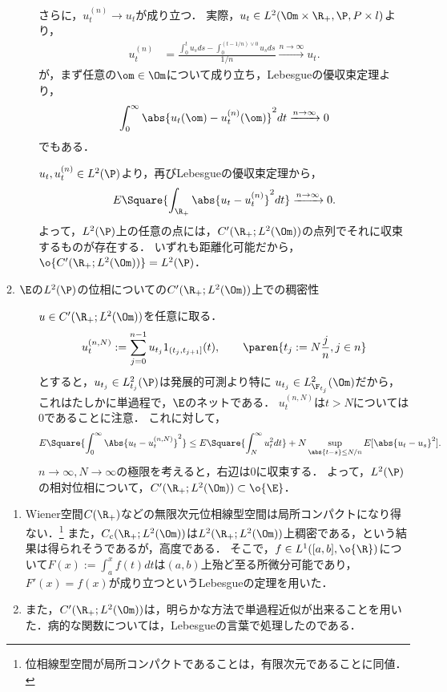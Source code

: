 \documentclass[uplatex,dvipdfmx]{jsreport}
\begin{document}
\begin{Proof}
\begin{description}
        さらに，$u_t^{(n)}\to u_t$が成り立つ．
        実際，$u_t\in L^2(\Om\times\R_+,\P,P\times l)$より，
        \begin{align*}
            u_t^{(n)}&=\frac{\int^t_0u_sds-\int^{(t-1/n)\lor0}_0u_sds}{1/n}\xrightarrow{n\to\infty}u_t.
        \end{align*}
        が，まず任意の$\om\in\Om$について成り立ち，Lebesgueの優収束定理より，
        \[\int^\infty_0\abs{u_t(\om)-u^{(n)}_t(\om)}^2dt\xrightarrow{n\to\infty}0\]
        でもある．
        
        $u_t,u_t^{(n)}\in L^2(\P)$より，再びLebesgueの優収束定理から，
        \[E\Square{\int_{\R_+}\abs{u_t-u_t^{(n)}}^2dt}\xrightarrow{n\to\infty}0.\]
        よって，$L^2(\P)$上の任意の点には，$C'(\R_+;L^2(\Om))$の点列でそれに収束するものが存在する．
        いずれも距離化可能だから，$\o{C'(\R_+;L^2(\Om))}=L^2(\P)$．
        \item[2. $\E$の$L^2(\P)$の位相についての$ C'(\R_+;L^2(\Om))$上での稠密性]
        $u\in  C'(\R_+;L^2(\Om))$を任意に取る．
        \[u^{(n,N)}_t:=\sum^{n-1}_{j=0}u_{t_j}1_{(t_j,t_{j+1}]}(t),\qquad\paren{t_j:=N\frac{j}{n},j\in n}\]
        とすると，$u_{t_j}\in L^2_{t_j}(\P)$は発展的可測より特に
        $u_{t_j}\in L_{\F_{t_j}}^2(\Om)$だから，これはたしかに単過程で，$\E$のネットである．
        $u^{(n,N)}_t$は$t> N$については$0$であることに注意．
        これに対して，
        \[E\Square{\int^\infty_0\Abs{u_t-u_t^{(n,N)}}^2}\le E\Square{\int^\infty_Nu^2_tdt}+N\sup_{\abs{t-s}\le N/n}E[\abs{u_t-u_s}^2].\]
        $n\to\infty,N\to\infty$の極限を考えると，右辺は$0$に収束する．
        よって，$L^2(\P)$の相対位相について，$C'(\R_+;L^2(\Om))\subset\o{\E}$．
    \end{description}
\end{Proof}
\begin{remarks}\mbox{}
    \begin{enumerate}
        \item Wiener空間$C(\R_+)$などの無限次元位相線型空間は局所コンパクトになり得ない．\footnote{位相線型空間が局所コンパクトであることは，有限次元であることに同値．}
        また，$C_c(\R_+;L^2(\Om))$は$L^2(\R_+;L^2(\Om))$上稠密である，という結果は得られそうであるが，高度である．
        そこで，$f\in L^1([a,b],\o{\R})$について$F(x):=\int^x_af(t)dt$は$(a,b)$上殆ど至る所微分可能であり，$F'(x)=f(x)$が成り立つというLebesgueの定理を用いた．
        \item また，$C'(\R_+;L^2(\Om))$は，明らかな方法で単過程近似が出来ることを用いた．病的な関数については，Lebesgueの言葉で処理したのである．
    \end{enumerate}
\end{remarks}
\end{document}
